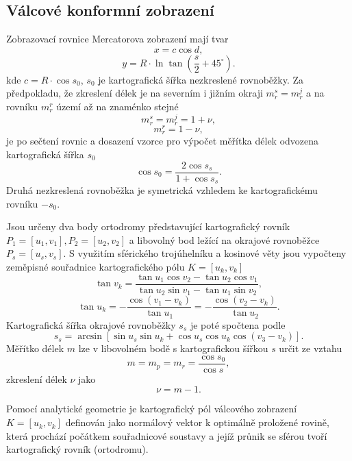 \documentclass[12pt]{article}
\begin{document}
\subsection{Válcové konformní zobrazení}
Zobrazovací rovnice Mercatorova zobrazení mají tvar
\[
x = c \cos d,
\]
\[
y = R \cdot \ln \tan \left(\frac{s}{2} + 45^\circ\right).
\]
kde $c = R \cdot \cos s_0$, $s_0$ je kartografická šířka nezkreslené rovnoběžky. Za předpokladu, že zkreslení délek je na severním i jižním okraji $m_r^s = m_r^j$ a na rovníku $m_r^r$ území až na znaménko stejné
\[
m_r^s = m_r^j = 1 + \nu,
\]
\[
m_r^r = 1 - \nu,
\]
je po sečtení rovnic a dosazení vzorce pro výpočet měřítka délek odvozena kartografická šířka $s_0$
\[
\cos s_0 = \frac{2 \cos s_s}{1 + \cos s_s}.
\]
Druhá nezkreslená rovnoběžka je symetrická vzhledem ke kartografickému rovníku $-s_0$.

Jsou určeny dva body ortodromy představující kartografický rovník $P_1 = [u_1, v_1], P_2 = [u_2, v_2]$ a libovolný bod ležící na okrajové rovnoběžce $P_s = [u_s, v_s]$. S využitím sférického trojúhelníku a kosinové věty jsou vypočteny zeměpisné souřadnice kartografického pólu $K = [u_k, v_k]$
\[
\tan v_k = \frac{\tan u_1 \cos v_2 - \tan u_2 \cos v_1}{\tan u_2 \sin v_1 - \tan u_1 \sin v_2},
\]
\[
\tan u_k = -\frac{\cos(v_1 - v_k)}{\tan u_1} = -\frac{\cos(v_2 - v_k)}{\tan u_2}.
\]
Kartografická šířka okrajové rovnoběžky $s_s$ je poté spočtena podle
\[
s_s = \arcsin \left[ \sin u_s \sin u_k + \cos u_s \cos u_k \cos (v_3 - v_k) \right].
\]
Měřítko délek $m$ lze v libovolném bodě s kartografickou šířkou $s$ určit ze vztahu
\[
m = m_p = m_r = \frac{\cos s_0}{\cos s},
\]
zkreslení délek $\nu$ jako
\[
\nu = m - 1.
\]

Pomocí analytické geometrie je kartografický pól válcového zobrazení $K = [u_k, v_k]$ definován jako normálový vektor k optimálně proložené rovině, která prochází počátkem souřadnicové soustavy a jejíž průnik se sférou tvoří kartografický rovník (ortodromu).
\end{document}
